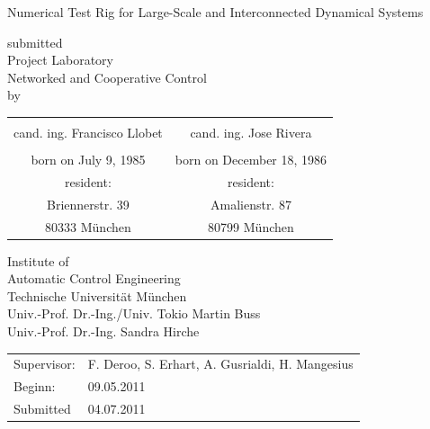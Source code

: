 \documentclass[a4paper,twoside, openright,12pt]{report}
\begin{document}
\pagestyle{empty}
\enlargethispage{4.5cm} %
\begin{center}
\phantom{u}
\vspace{0.5cm}
\Huge{\sc Numerical Test Rig for Large-Scale and Interconnected Dynamical
Systems}\\
\vspace{1.5cm}
                                 \large{submitted\\
				  Project Laboratory\\
				  Networked and Cooperative Control\\
					   by         

						
					\begin{tabular}{c c}
					    \vspace{0.4cm} & \vspace{0.4cm} \\
					 cand. ing. Francisco Llobet& cand. ing. Jose Rivera  \\
						\vspace{0.5cm} & \vspace{0.5cm}\\
					born on July 9, 1985 & born on December 18, 1986\\
					resident: & resident:\\
					Briennerstr. 39& Amalienstr. 87\\
					80333 M\"{u}nchen & 80799 M\"{u}nchen  
					\end{tabular}

					                           
					\vspace{1.5cm}
					Institute of\\
					Automatic Control Engineering\\
					Technische Universit\"{a}t M\"{u}nchen\\
					\vspace{0.3cm}
					Univ.-Prof. Dr.-Ing./Univ. Tokio Martin Buss\\
                                        Univ.-Prof. Dr.-Ing. Sandra Hirche}
\end{center}
\vspace{2.5cm}
\begin{tabular}{ll}
Supervisor: & F. Deroo, S. Erhart, A. Gusrialdi, H. Mangesius  \\
Beginn: & 09.05.2011  \\
Submitted &  04.07.2011 \\
\end{tabular}
\end{document}
